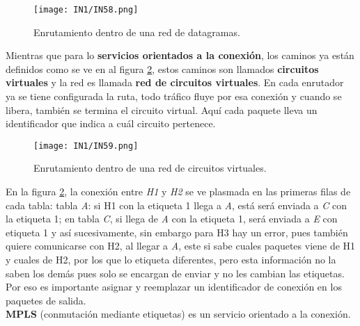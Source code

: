 \documentclass[
	12pt, %
	fleqn, %
	a4paper, %
]{LegrandOrangeBook}
\begin{document}
\begin{figure}[H]
\centering
\texttt{[image: IN1/IN58.png]}
\caption{Enrutamiento dentro de una red de datagramas.}
\label{fig:enru datagrama}
\end{figure}
Mientras que para lo \textbf{servicios orientados a la conexión}, los caminos ya están definidos como se ve en al figura \ref{fig:circ virt}, estos caminos son llamados \textbf{circuitos virtuales} y la red es llamada \textbf{red de circuitos virtuales}. En cada enrutador ya se tiene configurada la ruta, todo tráfico fluye por esa conexión y cuando se libera, también se termina el circuito virtual. Aquí cada paquete lleva un identificador que indica a cuál circuito pertenece.
\begin{figure}[H]
\centering
\texttt{[image: IN1/IN59.png]}
\caption{Enrutamiento dentro de una red de circuitos virtuales.}
\label{fig:circ virt}
\end{figure}
En la figura \ref{fig:circ virt}, la conexión entre \textit{H1} y \textit{H2} se ve plasmada en las primeras filas de cada tabla: tabla \textit{A}: si H1 con la etiqueta 1 llega a \textit{A}, está será enviada a \textit{C} con la etiqueta 1; en tabla \textit{C}, si llega de \textit{A} con la etiqueta 1, será enviada a \textit{E} con etiqueta 1 y así sucesivamente, sin embargo para H3 hay un error, pues también quiere comunicarse con H2, al llegar a \textit{A}, este si sabe cuales paquetes viene de H1 y cuales de H2, por los que lo etiqueta diferentes, pero esta información no la saben los demás pues solo se encargan de enviar y no les cambian las etiquetas. Por eso es importante asignar y reemplazar un identificador de conexión en los paquetes de salida.\\\textbf{MPLS} (conmutación mediante etiquetas) es un servicio orientado a la conexión. 
\end{document}
